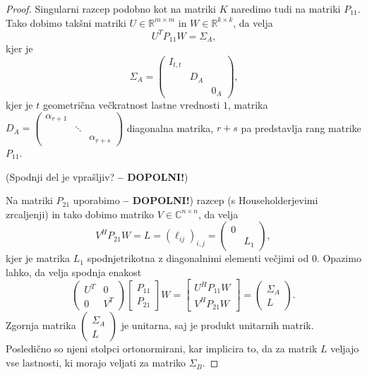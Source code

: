 \documentclass[mat1]{article}
\begin{document}
\begin{proof}
Singularni razcep podobno kot na matriki $K$ naredimo tudi na matriki $P_{11}$. Tako dobimo takšni matriki $U \in \mathbb{R}^{m \times m}$ in $W \in \mathbb{R}^{k \times k}$, da velja $$ U^T P_{11} W = \Sigma_A \text{,}$$ kjer je $$\Sigma_A = 
\begin{pmatrix} 
I_{t, t} &  & \\
 & D_A & \\
 & & 0_A  
\end{pmatrix} \text{,}$$ kjer je $t$ geometrična večkratnost lastne vrednosti $1$, matrika $D_A =
\begin{pmatrix}
\alpha_{r+1} & & \\
 & \ddots & \\
 & & \alpha_{r+s}
\end{pmatrix}$ diagonalna matrika, $r+s$ pa predstavlja rang matrike $P_{11}$.

(Spodnji del je vprašljiv? \textbf{-- DOPOLNI!})

Na matriki $P_{21}$ uporabimo \textbf{-- DOPOLNI!}) razcep (s Householderjevimi zrcaljenji) in tako dobimo matriko $V \in \mathbb{C}^{n \times n}$, da velja $$ V^H P_{21} W = L = (\ell_{ij})_{i, j} =
\begin{pmatrix} 
0 &  \\
& L_1
\end{pmatrix}
,$$ kjer je matrika $L_1$ spodnjetrikotna z diagonalnimi elementi večjimi od $0$.
Opazimo lahko, da velja spodnja enakost
$$
\begin{pmatrix} 
U^T & 0 \\
0 & V^T
\end{pmatrix}
\begin{bmatrix}
P_{11} \\
P_{21}
\end{bmatrix} W = 
\begin{bmatrix}
U^H P_{11} W \\
V^H P_{21} W
\end{bmatrix} =
\begin{pmatrix}
\Sigma_A \\
L
\end{pmatrix}.
$$
Zgornja matrika $\begin{pmatrix}
\Sigma_A \\
L
\end{pmatrix}$ je unitarna, saj je produkt unitarnih matrik. Posledično so njeni stolpci ortonormirani, kar implicira to, da za matrik $L$ veljajo vse lastnosti, ki morajo veljati za matriko $\Sigma_B$.


\end{proof}
\end{document}
